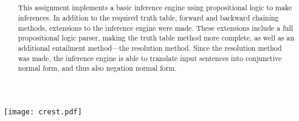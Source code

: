 \author
{
  { \authorname }
  { \small \scshape \studentid }
}
\date { \doccdate }
\title
{
  { \doctitle                         } \\
  { \slshape \normalsize \unitdesc    } \\
  { \scshape \normalsize \university  }
}

\maketitle

\begin{center}
  \texttt{[image: crest.pdf]}
\end{center}

\begin{abstract}
  This assignment implements a basic inference engine using propositional logic
  to make inferences. In addition to the required truth table, forward and
  backward chaining methods, extensions to the inference engine were made. These
  extensions include a full propositional logic parser, making the truth table
  method more complete, as well as an additional entailment method---the
  resolution method. Since the resolution method was made, the inference engine
  is able to translate input sentences into conjunctive normal form, and thus
  also negation normal form.
\end{abstract}
